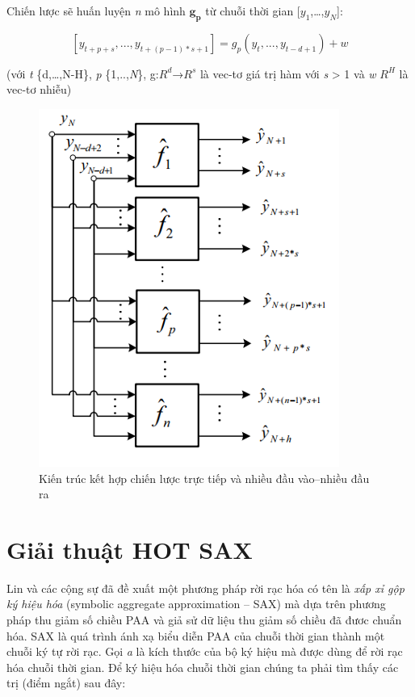 Chiến lược sẽ huấn luyện \textit{n} mô hình $\mathbf{g_{p}}$ từ chuỗi thời gian [$y_{1}$,…,$y_{N}$]:

\begin{equation}
\label{eq:20}
[y_{t+p+s},...,y_{t+(p-1)*s+1}]= g_p(y_t,...,y_{t-d+1}) + w
\tag{20}
\end{equation}

\begin{center}
(với \textit{t} \in \{d,…,N-H\}, \textit{p} \in \{1,..,\textit{N}\}, g:$R^{d}$→$R^{s}$ là vec-tơ giá trị hàm với \textit{s} > 1 và \textit{w} \in \: $R^{H}$ là vec-tơ nhiễu)
\end{center}

\begin{figure}[H]
    \centering
    \includegraphics[scale=1.25]{./content/images/3-5.png}
    \caption{Kiến trúc kết hợp chiến lược trực tiếp và nhiều đầu vào–nhiều đầu ra \cite{st17}}
    \label{fig:3-5}
\end{figure}

\section{Giải thuật HOT SAX}
Lin và các cộng sự \cite{st6} \cite{st34} đã đề xuất một phương pháp rời rạc hóa có tên là \textit{xấp xỉ gộp ký hiệu hóa} (symbolic aggregate approximation – SAX) mà dựa trên phương pháp thu giảm số chiều PAA \cite{st9} \cite{st33} và giả sử dữ liệu thu giảm số chiều đã đươc chuẩn hóa. SAX là quá trình ánh xạ biểu diễn PAA của chuỗi thời gian thành một chuỗi ký tự rời rạc. Gọi \textit{a} là kích thước của bộ ký hiệu mà được dùng để rời rạc hóa chuỗi thời gian. Để ký hiệu hóa chuỗi thời gian chúng ta phải tìm thấy các trị (điểm ngắt) sau đây:

